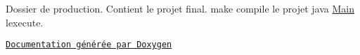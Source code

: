 Dossier de production. Contient le projet final. {\ttfamily make} compile le projet {\ttfamily java \hyperlink{class_main}{Main}} l\textquotesingle{}execute.

\href{http://rawgit.com/JulianHurst/ALS/master/src/docs/html/index.html}{\tt Documentation générée par Doxygen} 